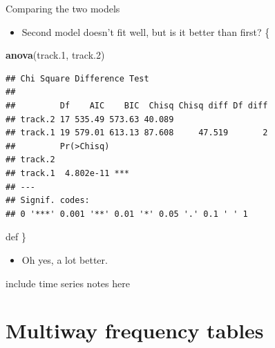 \documentclass[ignorenonframetext,]{beamer}
\newenvironment{Shaded}{\begin{snugshade}}{\end{snugshade}}
\newcommand{\FloatTok}[1]{\textcolor[rgb]{0.00,0.00,0.81}{#1}}
\newcommand{\KeywordTok}[1]{\textcolor[rgb]{0.13,0.29,0.53}{\textbf{#1}}}
\newcommand{\NormalTok}[1]{#1}
\providecommand{\tightlist}{%
  \setlength{\itemsep}{0pt}\setlength{\parskip}{0pt}}
\begin{document}
\begin{frame}[fragile]{Comparing the two models}
\protect\hypertarget{comparing-the-two-models}{}

\begin{itemize}
\tightlist
\item
  Second model doesn't fit well, but is it better than first?
  \{\small    
\end{itemize}

\begin{Shaded}
\begin{Highlighting}[]
\KeywordTok{anova}\NormalTok{(track}\FloatTok{.1}\NormalTok{, track}\FloatTok{.2}\NormalTok{)}
\end{Highlighting}
\end{Shaded}

\begin{verbatim}
## Chi Square Difference Test
## 
##         Df    AIC    BIC  Chisq Chisq diff Df diff
## track.2 17 535.49 573.63 40.089                   
## track.1 19 579.01 613.13 87.608     47.519       2
##         Pr(>Chisq)    
## track.2               
## track.1  4.802e-11 ***
## ---
## Signif. codes:  
## 0 '***' 0.001 '**' 0.01 '*' 0.05 '.' 0.1 ' ' 1
\end{verbatim}

def \}

\begin{itemize}
\tightlist
\item
  Oh yes, a lot better.
\end{itemize}

include time series notes here

\section{Multiway frequency tables}
\frame{\sectionpage}

\end{frame}
\end{document}
